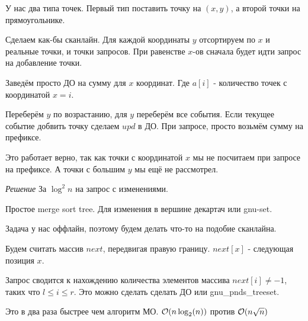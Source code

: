 У нас два типа точек. Первый тип поставить точку на $(x, y)$, а второй точки на прямоугольнике.

Сделаем как-бы сканлайн. Для каждой координаты $y$ отсортируем по $x$ и реальные точки, и точки запросов. При равенстве $x$-ов сначала будет идти запрос на добавление точки.

Заведём просто ДО на сумму для $x$ координат. Где $a[i]$ - количество точек с координатой $x=i$.

Переберём $y$ по возрастанию, для $y$ переберём все события. Если текущее событие добвить точку сделаем $upd$ в ДО. При запросе, просто возьмём сумму на префиксе.

Это работает верно, так как точки с координатой $x$ мы не посчитаем при запросе на префиксе.
А точки с большим $y$ мы ещё не рассмотрел.

{\it Решение } За $\log^2 n$ на запрос с изменениями.

Простое merge sort tree. Для изменения в вершине декартач или gnu-set.



Задача у нас оффлайн, поэтому будем делать что-то на подобие сканлайна.

Будем считать массив $next$, передвигая правую границу. $next[x]$ - следующая позиция $x$.

Запрос сводится к нахождению количества элементов массива $next[i] \ne -1$, таких что $l \le i \le r$. Это можно сделать сделать ДО или gnu\_pnds\_treeset.

Это в два раза быстрее чем алгоритм МО. $ \mathcal{O}(n \log_2(n))$ против $ \mathcal{O}(n \sqrt n)$

